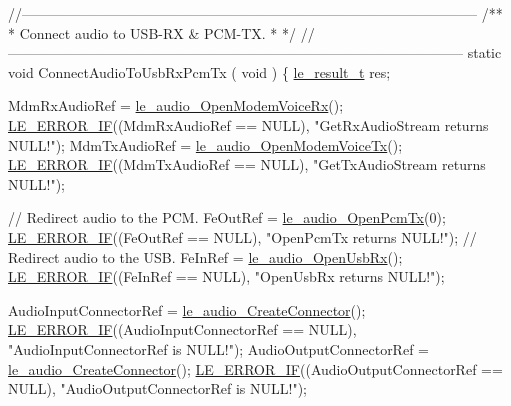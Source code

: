 \begin{DoxyCodeInclude}
{{{{\textcolor{comment}{//--------------------------------------------------------------------------------------------------}\textcolor{comment}{}
\textcolor{comment}{/**}
\textcolor{comment}{ * Connect audio to USB-RX & PCM-TX.}
\textcolor{comment}{ *}
\textcolor{comment}{ */}
\textcolor{comment}{//--------------------------------------------------------------------------------------------------}
\textcolor{keyword}{static} \textcolor{keywordtype}{void} ConnectAudioToUsbRxPcmTx
(
    \textcolor{keywordtype}{void}
)
\{
    \hyperlink{le__basics_8h_a1cca095ed6ebab24b57a636382a6c86c}{le\_result\_t} res;

    MdmRxAudioRef = \hyperlink{le__audio__interface_8h_ae3ed568ba4d2763ea77e17e77b20ff02}{le\_audio\_OpenModemVoiceRx}();
    \hyperlink{le__log_8h_aceaf11a11691d6c676e36dd317b38dbd}{LE\_ERROR\_IF}((MdmRxAudioRef == NULL), \textcolor{stringliteral}{"GetRxAudioStream returns NULL!"});
    MdmTxAudioRef = \hyperlink{le__audio__interface_8h_ad745f008bb04873c817da7af3daf783d}{le\_audio\_OpenModemVoiceTx}();
    \hyperlink{le__log_8h_aceaf11a11691d6c676e36dd317b38dbd}{LE\_ERROR\_IF}((MdmTxAudioRef == NULL), \textcolor{stringliteral}{"GetTxAudioStream returns NULL!"});

    \textcolor{comment}{// Redirect audio to the PCM.}
    FeOutRef = \hyperlink{le__audio__interface_8h_a5e112543e8525775aa670dc71b320766}{le\_audio\_OpenPcmTx}(0);
    \hyperlink{le__log_8h_aceaf11a11691d6c676e36dd317b38dbd}{LE\_ERROR\_IF}((FeOutRef == NULL), \textcolor{stringliteral}{"OpenPcmTx returns NULL!"});
    \textcolor{comment}{// Redirect audio to the USB.}
    FeInRef = \hyperlink{le__audio__interface_8h_acd8be89289067cef9441a8ed1d891146}{le\_audio\_OpenUsbRx}();
    \hyperlink{le__log_8h_aceaf11a11691d6c676e36dd317b38dbd}{LE\_ERROR\_IF}((FeInRef == NULL), \textcolor{stringliteral}{"OpenUsbRx returns NULL!"});

    AudioInputConnectorRef = \hyperlink{le__audio__interface_8h_a570aaf85086f00aca592acfbaaa237be}{le\_audio\_CreateConnector}();
    \hyperlink{le__log_8h_aceaf11a11691d6c676e36dd317b38dbd}{LE\_ERROR\_IF}((AudioInputConnectorRef == NULL), \textcolor{stringliteral}{"AudioInputConnectorRef is NULL!"});
    AudioOutputConnectorRef = \hyperlink{le__audio__interface_8h_a570aaf85086f00aca592acfbaaa237be}{le\_audio\_CreateConnector}();
    \hyperlink{le__log_8h_aceaf11a11691d6c676e36dd317b38dbd}{LE\_ERROR\_IF}((AudioOutputConnectorRef == NULL), \textcolor{stringliteral}{"AudioOutputConnectorRef is NULL!"});

}}}}
\end{DoxyCodeInclude}

